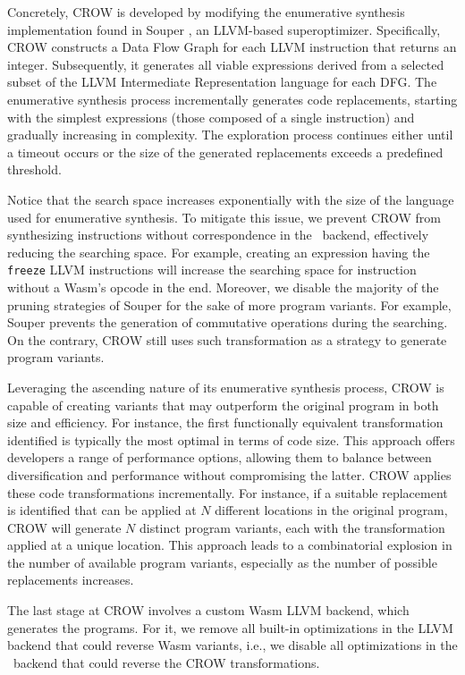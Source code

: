 Concretely, CROW is developed by modifying the enumerative synthesis implementation found in Souper \cite{Sasnauskas2017Souper:Superoptimizer}, an LLVM-based superoptimizer. 
Specifically, CROW constructs a Data Flow Graph for each LLVM instruction that returns an integer. 
Subsequently, it generates all viable expressions derived from a selected subset of the LLVM Intermediate Representation language for each DFG.
The enumerative synthesis process incrementally generates code replacements, starting with the simplest expressions (those composed of a single instruction) and gradually increasing in complexity. 
The exploration process continues either until a timeout occurs or the size of the generated replacements exceeds a predefined threshold.


Notice that the search space increases exponentially with the size of the language used for enumerative synthesis. 
To mitigate this issue, we prevent CROW from synthesizing instructions without correspondence in the \wasm\ backend, effectively reducing the searching space. 
For example, creating an expression having the  \texttt{freeze} LLVM instructions will increase the searching space for instruction without a Wasm's opcode in the end.
Moreover, we disable the majority of the pruning strategies of Souper for the sake of more program variants.
For example, Souper prevents the generation of commutative operations during the searching.
On the contrary, CROW still uses such transformation as a strategy to generate program variants. 


Leveraging the ascending nature of its enumerative synthesis process, CROW is capable of creating variants that may outperform the original program in both size and efficiency. 
For instance, the first functionally equivalent transformation identified is typically the most optimal in terms of code size. 
This approach offers developers a range of performance options, allowing them to balance between diversification and performance without compromising the latter.
CROW applies these code transformations incrementally. 
For instance, if a suitable replacement is identified that can be applied at $N$ different locations in the original program, CROW will generate $N$ distinct program variants, each with the transformation applied at a unique location. 
This approach leads to a combinatorial explosion in the number of available program variants, especially as the number of possible replacements increases.

The last stage at CROW involves a custom Wasm LLVM backend, which generates the \wasm programs.
For it, we remove all built-in optimizations in the LLVM backend that could reverse Wasm variants, i.e., we disable all optimizations in the \wasm\ backend that could reverse the CROW transformations.

